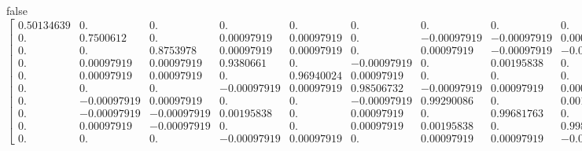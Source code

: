 \documentclass{article} %
\begin{document}
\if false
\[
\begin{bmatrix}
  0.50134639 &  0.         &  0.         &  0.         &  0.         &
  0.         &  0.         &  0.         & 0.          &  0.        \\
  0.         &  0.7500612  &  0.         &  0.00097919 &  0.00097919 &
  0.         & -0.00097919 & -0.00097919 &  0.00097919 &  0.        \\
  0.         &  0.         &  0.8753978  &  0.00097919 &  0.00097919 &
  0.         &  0.00097919 & -0.00097919 & -0.00097919 &  0.        \\
  0.         &  0.00097919 &  0.00097919 &  0.9380661  &  0.         &
  -0.00097919 &  0.         &  0.00195838 &  0.         & -0.00097919\\
  0.         &  0.00097919 &  0.00097919 &  0.         &  0.96940024 &
  0.00097919 &  0.         &  0.         &  0.         &  0.00097919\\
  0.         &  0.         &  0.         & -0.00097919 &  0.00097919 &
  0.98506732 & -0.00097919 &  0.00097919 &  0.00097919 &  0.        \\
  0.         & -0.00097919 &  0.00097919 &  0.         &  0.         &
  -0.00097919 &  0.99290086 &  0.         &  0.00195838 &  0.00097919\\
  0.         & -0.00097919 & -0.00097919 &  0.00195838 &  0.         &
  0.00097919 &  0.         &  0.99681763 &  0.         &  0.00097919\\
  0.         &  0.00097919 & -0.00097919 &  0.         &  0.         &
  0.00097919 &  0.00195838 &  0.         &  0.99877601 & -0.00097919\\
  0.         &  0.         &  0.         & -0.00097919 &  0.00097919 &
  0.         &  0.00097919 &  0.00097919 & -0.00097919 &  0.9997552
\end{bmatrix}
\]
\fi
\end{document}
